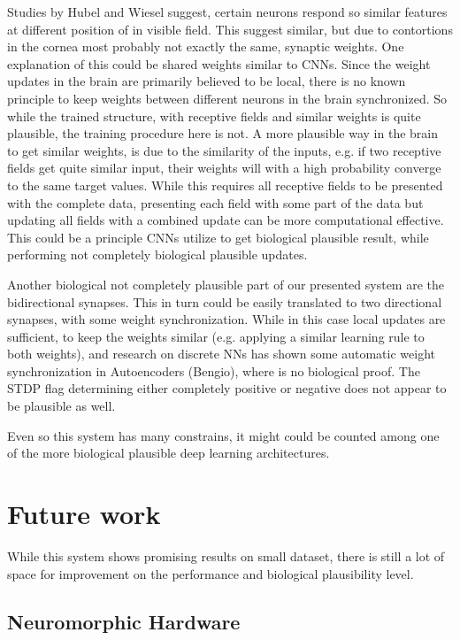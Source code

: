 Studies by Hubel and Wiesel suggest, certain neurons respond so similar features at different position of in visible field.
This suggest similar, but due to contortions in the cornea most probably not exactly the same, synaptic weights. 
One explanation of this could be shared weights similar to CNNs. 
Since the weight updates in the brain are primarily believed to be local, there is no known principle to keep weights between different neurons in the brain synchronized.
So while the trained structure, with receptive fields and similar weights is quite plausible, the training procedure here is not.
A more plausible way in the brain to get similar weights, is due to the similarity of the inputs, e.g. if two receptive fields get quite similar input, their weights will with a high probability converge to the same target values.  
While this requires all receptive fields to be presented with the complete data, presenting each field with some part of the data but updating all fields with a combined update can be more computational effective. 
This could be a principle CNNs utilize to get biological plausible result, while performing not completely biological plausible updates.

Another biological not completely plausible part of our presented system are the bidirectional synapses.
This in turn could be easily translated to two directional synapses, with some weight synchronization. 
While in this case local updates are sufficient, to keep the weights similar (e.g. applying a similar learning rule to both weights), and research on discrete NNs has shown some automatic weight synchronization in Autoencoders (Bengio), where is no biological proof.
The STDP flag determining either completely positive or negative does not appear to be plausible as well.

Even so this system has many constrains, it might could be counted among one of the more biological plausible deep learning architectures.     

\section{Future work}

While this system shows promising results on small dataset, there is still a lot of space for improvement on the performance and biological plausibility level.

\subsection{Neuromorphic Hardware}

